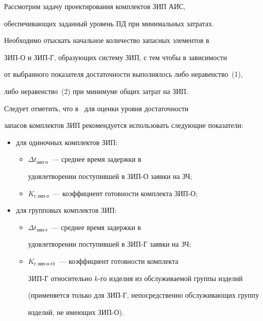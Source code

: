      


     Рассмотрим задачу проектирования комплектов ЗИП АИС, 


обеспечивающих заданный уровень ПД при минимальных затратах.


     


      Необходимо отыскать начальное количество запасных элементов в 


     ЗИП-О и ЗИП-Г, образующих систему ЗИП, с тем чтобы в зависимости 


от выбранного показателя достаточности выполнялось либо неравенство~(1), 


либо неравенство~(2) при минимуме общих затрат на ЗИП.


     


     Следует отметить, что в~\cite{11-koz} для оценки уровня достаточности 


запасов комплектов ЗИП рекомендуется использовать следующие показатели:


     \begin{itemize}


     \item для одиночных комплектов ЗИП:


     \begin{itemize}


\item      $\Delta t_{\mathrm{зип\mbox{-}о}}$~--- среднее время задержки в 


удовлетворении поступившей в ЗИП-О заявки на ЗЧ;


\item     


     $K_{\mathrm{г.зип\mbox{-}о}}$~--- коэффициент готовности комплекта ЗИП-О;


     \end{itemize}


     \item для групповых комплектов ЗИП:


\begin{itemize}


\item     $\Delta t_{\mathrm{зип\mbox{-}г}}$~--- среднее время задержки в 


удовлетворении поступившей в ЗИП-Г заявки на ЗЧ;


     \item


     $K_{\mathrm{г.зип\mbox{-}о\mbox{-}г}k}$~--- коэффициент готовности комплекта 


ЗИП-Г относительно $k$-го изделия из обслуживаемой группы изделий 


(применяется только для ЗИП-Г, непосредственно обслуживающих группу 


изделий, не имеющих ЗИП-О).


\end{itemize}


     \end{itemize}


